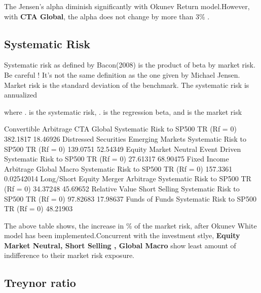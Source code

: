 \documentclass[12pt,letterpaper,english]{article}
\begin{document}
The Jensen's alpha diminish significantly with Okunev Return model.However, with \textbf{CTA Global}, the alpha does not change by more than 3\% .
\subsection{Systematic Risk}

Systematic risk as defined by Bacon(2008) is the product of beta by market risk. Be careful ! It's not the same definition as the one given by Michael Jensen. Market risk is the standard deviation of the benchmark. The systematic risk is annualized


where . is the systematic risk, \eqn{\beta}. is the regression beta, and  is the market risk

\begin{Schunk}
\begin{Soutput}
                                     Convertible Arbitrage CTA Global
Systematic Risk to SP500 TR (Rf = 0)              382.1817   18.46926
                                     Distressed Securities Emerging Markets
Systematic Risk to SP500 TR (Rf = 0)              139.0751         52.54349
                                     Equity Market Neutral Event Driven
Systematic Risk to SP500 TR (Rf = 0)              27.61317     68.90475
                                     Fixed Income Arbitrage Global Macro
Systematic Risk to SP500 TR (Rf = 0)               157.3361   0.02542014
                                     Long/Short Equity Merger Arbitrage
Systematic Risk to SP500 TR (Rf = 0)          34.37248         45.69652
                                     Relative Value Short Selling
Systematic Risk to SP500 TR (Rf = 0)       97.82683      17.98637
                                     Funds of Funds
Systematic Risk to SP500 TR (Rf = 0)       48.21903
\end{Soutput}
\end{Schunk}

The above table shows, the increase in \% of the market risk, after Okunev White model has been implemented.Concurrent with the investment stlye, \textbf{Equity Market Neutral, Short Selling , Global Macro} show least amount of indifference to their market risk exposure.


\subsection{Treynor ratio }
\end{document}
